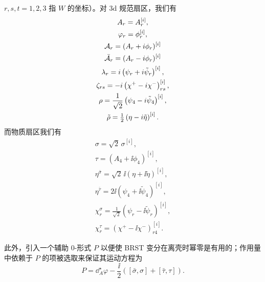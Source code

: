 
$r,s,t=1,2,3$ 指 $W$ 的坐标）。对 3d 规范扇区，我们有
\begin{gather*}
    A_r = A_r^{[i]}, \\
    \varphi_r = \phi_r^{[i]}, \\
    \mathcal{A}_r = (A_r+i\phi_r)^{[i]} \\
    \bar{\mathcal{A}}_r = (A_r-i\phi_r)^{[i]} \\
    \lambda_r = i\left(\psi_r+i\tilde\psi_r\right)^{[i]}, \\
    \zeta_{rs} = -i\left(\chi^+-i\chi^-\right)_{rs}^{[i]}, \\
    \rho = \frac{1}{\sqrt2}\left(\psi_4-i\tilde\psi_4\right)^{[i]}, \\
    \tilde\rho = \tfrac{1}{2}\left(\eta-i\tilde\eta\right)^{[i]} .
\end{gather*}
而物质扇区我们有
\begin{gather*}
    \sigma = \sqrt2\,\sigma^{[i]}, \\
    \tau = (A_4+\ii\phi_4)^{[i]}, \\
    \eta^{\bar\sigma} = \sqrt2\,\ii\left(\eta+\ii\tilde\eta\right)^{[i]}, \\
    \eta^{\bar\tau} = 2\ii\left(\psi_4+\ii\tilde\psi_4\right)^{[i]}, \\
    \chi_r^\sigma = \frac{1}{\sqrt2}\left(\psi_r-\ii\tilde\psi_r\right)^{[i]}, \\
    \chi_r^\tau = \left(\chi^+-\ii\chi^-\right)_{r4}^{[i]} .
\end{gather*}


此外，引入一个辅助 0-形式 $P$ 以便使 BRST 变分在离壳时幂零是有用的；作用量中依赖于 $P$ 的项被选取来保证其运动方程为
\[
    P = \dd_A^\star\varphi - \frac{\ii}{2}\left([\bar\sigma,\sigma]+[\bar\tau,\tau]\right) .
\]

